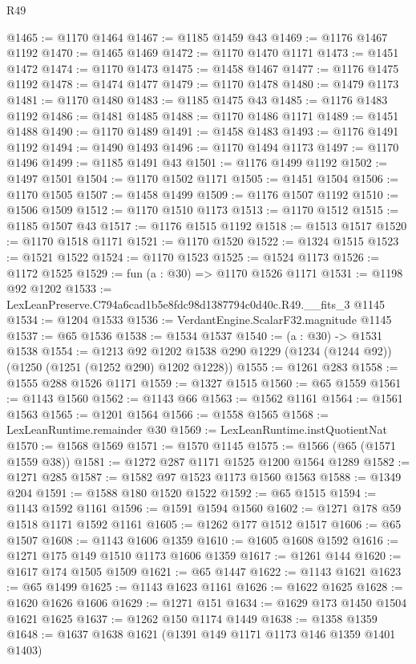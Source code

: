 \begin{lexlean}{R49}
\begin{coremodule}
@1465 := @1170 @1464
@1467 := @1185 @1459 @43
@1469 := @1176 @1467 @1192
@1470 := @1465 @1469
@1472 := @1170 @1470 @1171
@1473 := @1451 @1472
@1474 := @1170 @1473
@1475 := @1458 @1467
@1477 := @1176 @1475 @1192
@1478 := @1474 @1477
@1479 := @1170 @1478
@1480 := @1479 @1173
@1481 := @1170 @1480
@1483 := @1185 @1475 @43
@1485 := @1176 @1483 @1192
@1486 := @1481 @1485
@1488 := @1170 @1486 @1171
@1489 := @1451 @1488
@1490 := @1170 @1489
@1491 := @1458 @1483
@1493 := @1176 @1491 @1192
@1494 := @1490 @1493
@1496 := @1170 @1494 @1173
@1497 := @1170 @1496
@1499 := @1185 @1491 @43
@1501 := @1176 @1499 @1192
@1502 := @1497 @1501
@1504 := @1170 @1502 @1171
@1505 := @1451 @1504
@1506 := @1170 @1505
@1507 := @1458 @1499
@1509 := @1176 @1507 @1192
@1510 := @1506 @1509
@1512 := @1170 @1510 @1173
@1513 := @1170 @1512
@1515 := @1185 @1507 @43
@1517 := @1176 @1515 @1192
@1518 := @1513 @1517
@1520 := @1170 @1518 @1171
@1521 := @1170 @1520
@1522 := @1324 @1515
@1523 := @1521 @1522
@1524 := @1170 @1523
@1525 := @1524 @1173
@1526 := @1172 @1525
@1529 := fun (a : @30) => @1170 @1526 @1171
@1531 := @1198 @92 @1202
@1533 := LexLeanPreserve.C794a6cad1b5e8fdc98d1387794c0d40c.R49.__fits_3 @1145
@1534 := @1204 @1533
@1536 := VerdantEngine.ScalarF32.magnitude @1145
@1537 := @65 @1536
@1538 := @1534 @1537
@1540 := (a : @30) -> @1531 @1538
@1554 := @1213
    @92
    @1202
    @1538
    @290
    @1229
    (@1234 (@1244 @92))
    (@1250 (@1251 (@1252 @290) @1202 @1228))
@1555 := @1261 @283
@1558 := @1555 @288 @1526 @1171
@1559 := @1327 @1515
@1560 := @65 @1559
@1561 := @1143 @1560
@1562 := @1143 @66
@1563 := @1562 @1161
@1564 := @1561 @1563
@1565 := @1201 @1564
@1566 := @1558 @1565
@1568 := LexLeanRuntime.remainder @30
@1569 := LexLeanRuntime.instQuotientNat
@1570 := @1568 @1569
@1571 := @1570 @1145
@1575 := @1566 (@65 (@1571 @1559 @38))
@1581 := @1272 @287 @1171 @1525 @1200 @1564 @1289
@1582 := @1271 @285
@1587 := @1582 @97 @1523 @1173 @1560 @1563
@1588 := @1349 @204
@1591 := @1588 @180 @1520 @1522
@1592 := @65 @1515
@1594 := @1143 @1592 @1161
@1596 := @1591 @1594 @1560
@1602 := @1271 @178 @59 @1518 @1171 @1592 @1161
@1605 := @1262 @177 @1512 @1517
@1606 := @65 @1507
@1608 := @1143 @1606 @1359
@1610 := @1605 @1608 @1592
@1616 := @1271 @175 @149 @1510 @1173 @1606 @1359
@1617 := @1261 @144
@1620 := @1617 @174 @1505 @1509
@1621 := @65 @1447
@1622 := @1143 @1621
@1623 := @65 @1499
@1625 := @1143 @1623 @1161
@1626 := @1622 @1625
@1628 := @1620 @1626 @1606
@1629 := @1271 @151
@1634 := @1629 @173 @1450 @1504 @1621 @1625
@1637 := @1262 @150 @1174 @1449
@1638 := @1358 @1359
@1648 := @1637 @1638 @1621 (@1391 @149 @1171 @1173 @146 @1359 @1401 @1403)

\end{coremodule}
\end{lexlean}
